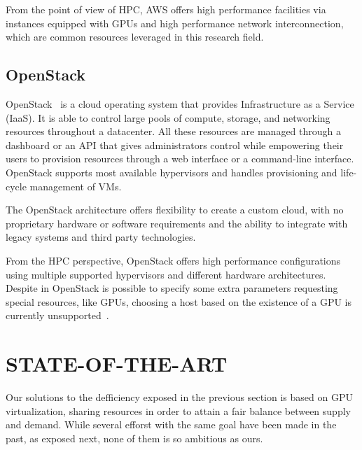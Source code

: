 \documentclass[a4paper,twoside]{article}
\begin{document}
From the point of view of HPC, AWS offers high performance facilities via 
instances equipped with GPUs and high performance network interconnection, which 
are common resources leveraged in this research field.

\subsection{OpenStack}
\label{sec:openstack}

OpenStack~\cite{OpenStack} is a cloud operating system that provides Infrastructure as a Service (IaaS). 
It is able to control large pools of compute, storage, and networking resources throughout a 
datacenter. All these resources are managed through a dashboard or an API that gives administrators 
control while empowering their users to provision resources through a web interface
or a command-line interface.  
OpenStack supports most available hypervisors and handles provisioning 
and life-cycle management of VMs.
 
The OpenStack architecture offers flexibility to create a custom cloud, with no proprietary hardware
or software requirements and the ability to integrate with legacy systems and third party technologies. 

From the HPC perspective, OpenStack offers high performance configurations using
multiple supported hypervisors and different hardware architectures. Despite in OpenStack is possible to 
specify some extra parameters requesting special resources, like GPUs, choosing a host based on the existence
of a GPU is currently unsupported~\cite{OpenStackGPU}. 

\section{\uppercase{State-of-the-Art}}
\label{sec:state}
Our solutions to the defficiency exposed in the previous section is based on GPU virtualization, sharing resources in order
to attain a fair balance between supply and demand. 
While several efforst with the same goal have been made in the past, as exposed next, 
none of them is so ambitious as ours. 
\end{document}
